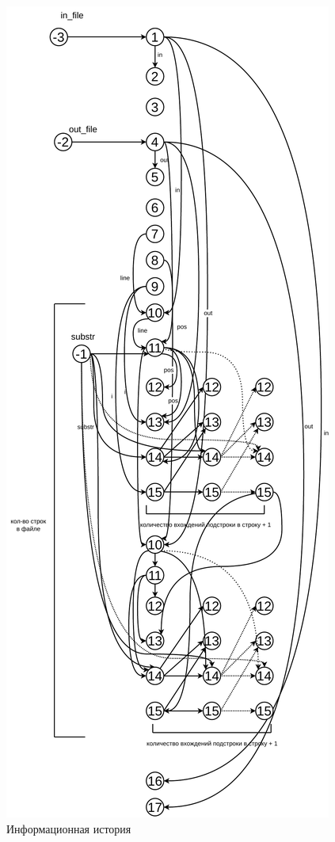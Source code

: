 \begin{figure}[h]
	\centering
	\includegraphics[height=0.95\textheight]{img/ИИ.pdf}
	\caption{Информационная история}
	\label{fig:g34}
\end{figure}

